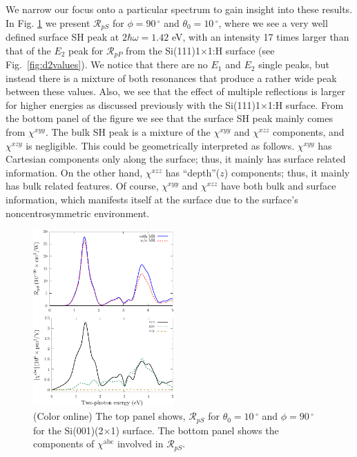 \documentclass[aps,prb,10pt,showpacs,letterpaper,twocolumn]{revtex4-1}
\begin{document}
We narrow our focus onto a particular spectrum to gain insight into these
results. In Fig. \ref{fig:rpsSi2x1} we present $\mathcal{R}_{pS}$ for $\phi =
90\,^{\circ}$ and $\theta_{0} = 10\,^{\circ}$, where we see a very well defined
surface SH peak at $2\hbar\omega = 1.42$ eV, with an intensity 17 times larger
than that of the $E_{2}$ peak for $\mathcal{R}_{pP}$ from the
Si(111)1$\times$1:H surface (see Fig.~\ref{fig:d2values}). We notice that there
are no $E_{1}$ and $E_{2}$ single peaks, but instead there is a mixture of both
resonances that produce a rather wide peak between these values. Also, we see
that the effect of multiple reflections is larger for higher energies as
discussed previously with the Si(111)1$\times$1:H surface. From the bottom panel
of the figure we see that the surface SH peak mainly comes from $\chi^{xyy}$.
The bulk SH peak is a mixture of the $\chi^{xyy}$ and $\chi^{xzz}$ components,
and $\chi^{xzy}$ is negligible. This could be geometrically interpreted as
follows. $\chi^{xyy}$ has Cartesian components only along the surface; thus, it
mainly has surface related information. On the other hand, $\chi^{xzz}$ has
``depth''($z$) components; thus, it mainly has bulk related features. Of course,
$\chi^{xyy}$ and $\chi^{xzz}$ have both bulk and surface information, which
manifests itself at the surface due to the surface's noncentrosymmetric
environment.

\begin{figure}[t]
\includegraphics[width=0.48\textwidth]{fig7}
\caption{(Color online) The top panel shows, $\mathcal{R}_{pS}$ for
$\theta_{0}=10\,^{\circ}$ and $\phi=90\,^{\circ}$ for the Si(001)(2$\times$1)
surface. The bottom panel shows the components of $\chi^{\mathrm{abc}}$ involved
in $\mathcal{R}_{pS}$.}
\label{fig:rpsSi2x1}
\end{figure}
\end{document}
